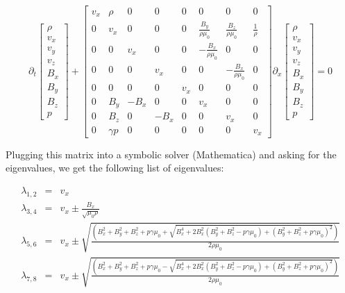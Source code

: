 \documentclass[%
 reprint,
 amsmath,amssymb,
 aps,
]{revtex4-2}
\begin{document}
\begin{equation}
\partial_t \begin{bmatrix}
\rho \\ v_x \\ v_y \\ v_z \\ B_x \\ B_y \\ B_z \\ p
\end{bmatrix} + \begin{bmatrix}
v_x & \rho & 0 & 0 & 0 & 0 & 0 & 0\\
0 & v_x & 0 & 0 & 0 & \frac{B_y}{\rho \mu_0} & \frac{B_z}{\rho \mu_0} & \frac{1}{\rho} \\
0 & 0 & v_x & 0 & 0 & - \frac{B_x}{\rho \mu_0} & 0 & 0 \\
0 & 0 & 0 & v_x & 0 & 0 & - \frac{B_x}{\rho \mu_0} & 0 \\
0 & 0 & 0 & 0 & v_x & 0 & 0 & 0 \\
0 & B_y & - B_x & 0 & 0 & v_x & 0 & 0 \\
0 & B_z & 0 & - B_x & 0 & 0 & v_x & 0 \\
0 & \gamma p & 0 & 0 & 0 & 0 & 0 & v_x
\end{bmatrix} \partial_x \begin{bmatrix} 
\rho \\ v_x \\ v_y \\ v_z \\ B_x \\ B_y \\ B_z \\ p
\end{bmatrix} = 0
\end{equation}

Plugging this matrix into a symbolic solver (Mathematica) and asking for the eigenvalues, we get the following list of eigenvalues:

\begin{eqnarray}
\lambda_{1, 2} & = & v_x \\
\lambda_{3, 4} & = & v_x \pm \frac{B_x}{\sqrt{\mu_0 \rho}} \\
\lambda_{5, 6} & = & v_x \pm \sqrt{\frac{\left(B_x ^2 + B_y ^2 + B_z ^2 + p \gamma \mu_0 + \sqrt{B_x ^4 + 2 B_x ^2 (B_y ^2 + B_z ^2 - p \gamma \mu_0) + (B_y ^2 + B_z ^2 + p \gamma \mu_0)^2} \right)}{2 \rho \mu_0}} \\
\lambda_{7, 8} & = & v_x \pm \sqrt{\frac{\left(B_x ^2 + B_y ^2 + B_z ^2 + p \gamma \mu_0 - \sqrt{B_x ^4 + 2 B_x ^2 (B_y ^2 + B_z ^2 - p \gamma \mu_0) + (B_y ^2 + B_z ^2 + p \gamma \mu_0)^2} \right)}{2 \rho \mu_0}}
\end{eqnarray}
\end{document}
